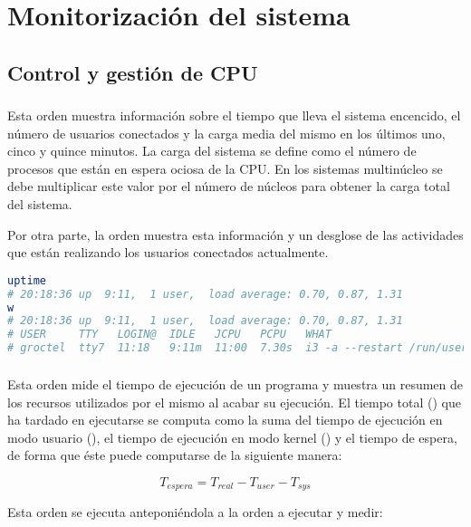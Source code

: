 \section{Monitorización del sistema}

\subsection{Control y gestión de CPU}

\subsubsection{}

Esta orden muestra información sobre el tiempo que lleva el sistema encencido, el número de usuarios conectados y la carga media del mismo en los últimos uno, cinco y quince minutos.
La carga del sistema se define como el número de procesos que están en espera ociosa de la CPU\@.
En los sistemas multinúcleo se debe multiplicar este valor por el número de núcleos para obtener la carga total del sistema.

Por otra parte, la orden  muestra esta información y un desglose de las actividades que están realizando los usuarios conectados actualmente.

\begin{lstlisting}[language=Bash]
uptime
# 20:18:36 up  9:11,  1 user,  load average: 0.70, 0.87, 1.31
w
# 20:18:36 up  9:11,  1 user,  load average: 0.70, 0.87, 1.31
# USER     TTY   LOGIN@  IDLE   JCPU   PCPU   WHAT
# groctel  tty7  11:18   9:11m  11:00  7.30s  i3 -a --restart /run/user/1000/i3/restart-state.1608
\end{lstlisting}

\subsubsection{}

Esta orden mide el tiempo de ejecución de un programa y muestra un resumen de los recursos utilizados por el mismo al acabar su ejecución.
El tiempo total () que ha tardado en ejecutarse se computa como la suma del tiempo de ejecución en modo usuario (), el tiempo de ejecución en modo kernel () y el tiempo de espera, de forma que éste puede computarse de la siguiente manera:

\[T_{espera}=T_{real}-T_{user}-T_{sys}\]

Esta orden se ejecuta anteponiéndola a la orden a ejecutar y medir:

